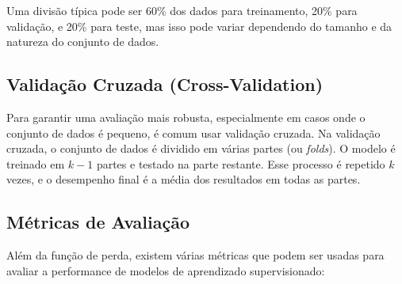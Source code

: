 \documentclass{article}
\begin{document}
Uma divisão típica pode ser 60\% dos dados para treinamento, 20\% para validação, e 20\% para teste, mas isso pode variar dependendo do tamanho e da natureza do conjunto de dados.

\subsection{Validação Cruzada (Cross-Validation)}

Para garantir uma avaliação mais robusta, especialmente em casos onde o conjunto de dados é pequeno, é comum usar validação cruzada. Na validação cruzada, o conjunto de dados é dividido em várias partes (ou \textit{folds}). O modelo é treinado em \(k-1\) partes e testado na parte restante. Esse processo é repetido \(k\) vezes, e o desempenho final é a média dos resultados em todas as partes.

\subsection{Métricas de Avaliação}

Além da função de perda, existem várias métricas que podem ser usadas para avaliar a performance de modelos de aprendizado supervisionado:
\end{document}
